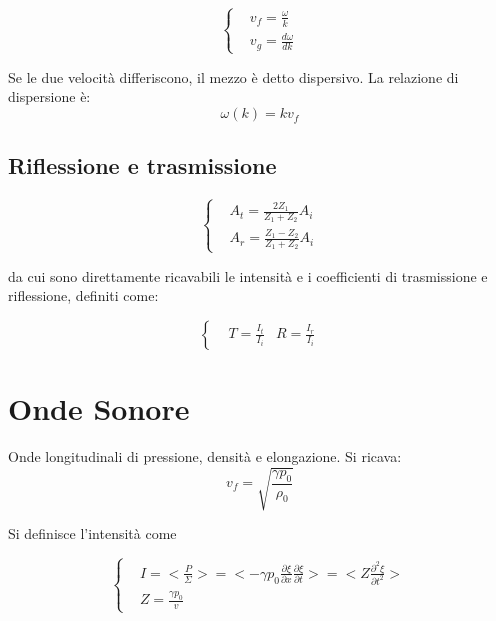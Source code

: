 \documentclass{article}
\begin{document}
\begin{equation}
\left\{
\begin{aligned}
& v_f=\frac{\omega}{k} \\
& v_g=\frac{d \omega}{d k}
\end{aligned}
\right.
\end{equation}

Se le due velocità differiscono, il mezzo è detto dispersivo.
La relazione di dispersione è:
\begin{equation}
    \omega(k)=k v_f
\end{equation}


\subsection{Riflessione e trasmissione}

\begin{equation}
\left\{
\begin{aligned}
    & A_t=\frac{2Z_1}{Z_1+Z_2}A_i \\
    & A_r=\frac{Z_1-Z_2}{Z_1+Z_2}A_i
\end{aligned}
\right.
\end{equation}

da cui sono direttamente ricavabili le intensità e i coefficienti di trasmissione e riflessione, definiti come:

\begin{equation}
\left\{
\begin{aligned}
    & T=\frac{I_t}{I_i}
    & R=\frac{I_r}{I_i}
\end{aligned}
\right.
\end{equation}

\section{Onde Sonore}
Onde longitudinali di pressione, densità e elongazione.
Si ricava:
\begin{equation}
    v_f=\sqrt{\frac{\gamma p_0}{\rho_0}}
\end{equation}

Si definisce l'intensità come

\begin{equation}
\left\{
\begin{aligned}
    & I=<\frac{P}{\Sigma}>= <-\gamma p_0 \frac{\partial \xi}{\partial x} \frac{\partial \xi}{\partial t}>=<Z\frac{\partial^2 \xi}{\partial t^2}> \\
    & Z=\frac{\gamma p_0}{v}
\end{aligned}
\right.
\end{equation}
\end{document}
